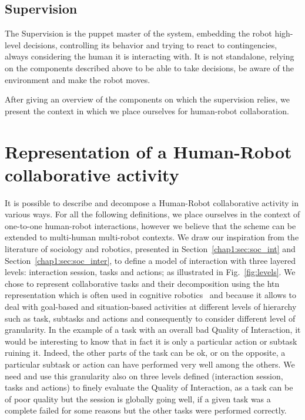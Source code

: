 \documentclass[a4paper,11pt,twoside]{StyleThese}
\begin{document}
\subsection{Supervision}
The Supervision is the puppet master of the system, embedding the robot high-level decisions, controlling its behavior and trying to react to contingencies, always considering the human it is interacting with. It is not standalone, relying on the components described above to be able to take decisions, be aware of the environment and make the robot moves.
\newline

After giving an overview of the components on which the supervision relies, we present the context in which we place ourselves for human-robot collaboration.

\section{Representation of a Human-Robot collaborative activity}\label{chap2:sec:levels}
It is possible to describe and decompose a Human-Robot collaborative activity in various ways. For all the following definitions, we place ourselves in the context of one-to-one human-robot interactions, however we  believe that the scheme can be extended to multi-human multi-robot contexts. 
We draw our inspiration from the literature of sociology and robotics, presented in Section~\ref{chap1:sec:soc_int} and Section~\ref{chap1:sec:soc_inter}, to define a model of interaction with three layered levels: interaction session, tasks and actions; as illustrated in Fig.~\ref{fig:levels}. We chose to represent collaborative tasks and their decomposition using the \acrfull{htn}~\cite{ghallab_2016_automated} representation which is often used in cognitive robotics~\cite{ingrand-2017,lallement_2014_hatp, buisan_2021_human} and because it allows to deal with goal-based and situation-based activities at different levels of hierarchy such as task, subtasks and actions and consequently to consider different level of granularity. In the example of a task with an overall bad Quality of Interaction, it would be interesting to know that in fact it is only a particular action or subtask ruining it. Indeed, the other parts of the task can be ok, or on the opposite, a particular subtask or action can have performed very well among the others. We need and use this granularity also on three levels defined (interaction session, tasks and actions) to finely evaluate the Quality of Interaction, as a task can be of poor quality but the session is globally going well, \eg if a given task was a complete failed for some reasons but the other tasks were performed correctly. 
\end{document}
